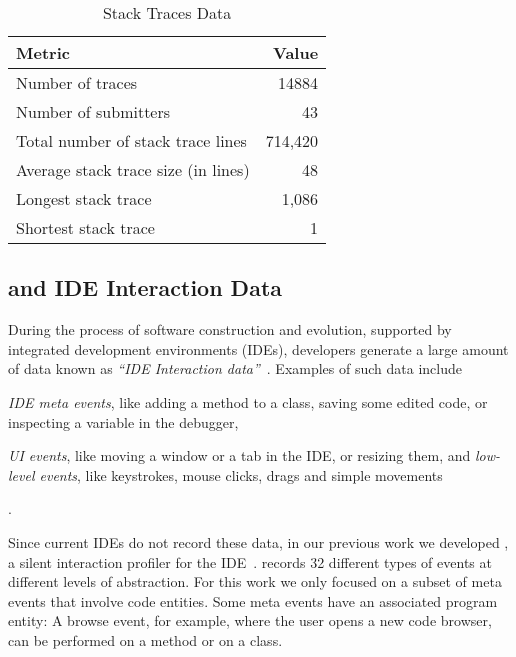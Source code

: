 \begin{table}[ht]
\caption{Stack Traces Data}
\label{tab:stacktraces}
\begin{tabularx}{\linewidth}{X|r}

\rowcolor{gray!30} \textbf{Metric} & \textbf{Value} \\ \hline Number of traces & 14884 \\
 Number of submitters & 43 \\
 Total number of stack trace lines & 714,420 \\
 Average stack trace size (in lines) & 48 \\
 Longest stack trace & 1,086 \\
 Shortest stack trace & 1 \\
\end{tabularx}
\end{table}




\subsection{\dfl and IDE Interaction Data}\label{sub:interaction}

During the process of software construction and evolution, supported by integrated development environments (IDEs), developers generate a large amount of data known as \emph{``IDE Interaction data''}~\cite{Kers2005, Murp2006}.
Examples of such data include \begin{inparaenum}[i)] \item \emph{IDE meta events}, like adding a method to a class, saving some edited code, or inspecting a variable in the debugger, \item \emph{UI events}, like moving a window or a tab in the IDE, or resizing them, and \emph{low-level events}, like keystrokes, mouse clicks, drags and simple movements\end{inparaenum}.

Since current IDEs do not record these data, in our previous work we developed \dfl, a silent interaction profiler for the \pha IDE~\cite{Mine2015b}.
\dfl records 32 different types of events at different levels of abstraction.
For this work we only focused on a subset of meta events that involve code entities.
Some meta events have an associated program entity: A browse event, for example, where the user opens a new code browser, can be performed on a method or on a class.

